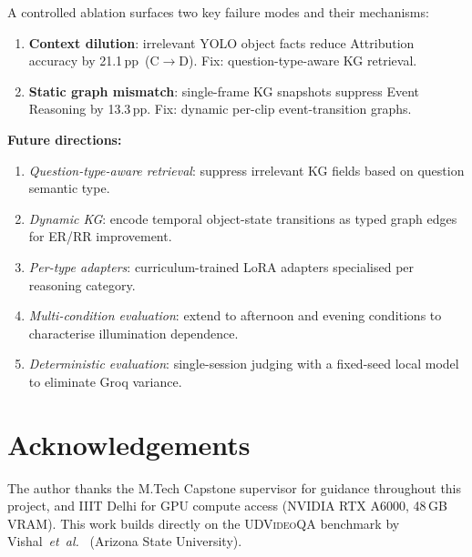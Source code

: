 \documentclass[10pt,conference,compsoc]{IEEEtran}
\newcommand{\dataset}{\textsc{UDVideoQA}}
\newcommand{\pp}{\,pp}                     %
\newcommand{\etal}{\textit{et~al.}}
\begin{document}
A controlled ablation surfaces two key failure modes and their
mechanisms:
\begin{enumerate}
  \item \textbf{Context dilution}: irrelevant YOLO object facts
        reduce Attribution accuracy by 21.1\pp\ (C$\to$D).
        Fix: question-type-aware KG retrieval.

  \item \textbf{Static graph mismatch}: single-frame KG snapshots
        suppress Event Reasoning by 13.3\pp.
        Fix: dynamic per-clip event-transition graphs.
\end{enumerate}

\textbf{Future directions:}
\begin{enumerate}[label=(\alph*)]
  \item \emph{Question-type-aware retrieval}: suppress irrelevant
        KG fields based on question semantic type.
  \item \emph{Dynamic KG}: encode temporal object-state transitions
        as typed graph edges for ER/RR improvement.
  \item \emph{Per-type adapters}: curriculum-trained LoRA adapters
        specialised per reasoning category.
  \item \emph{Multi-condition evaluation}: extend to afternoon and
        evening conditions to characterise illumination dependence.
  \item \emph{Deterministic evaluation}: single-session judging with
        a fixed-seed local model to eliminate Groq variance.
\end{enumerate}


\section*{Acknowledgements}

The author thanks the M.Tech Capstone supervisor for guidance
throughout this project, and IIIT Delhi for GPU compute
access (NVIDIA RTX A6000, 48\,GB VRAM).
This work builds directly on the \dataset{} benchmark by
Vishal~\etal~\cite{udvideoqa2026} (Arizona State University).


\balance   %
\end{document}
